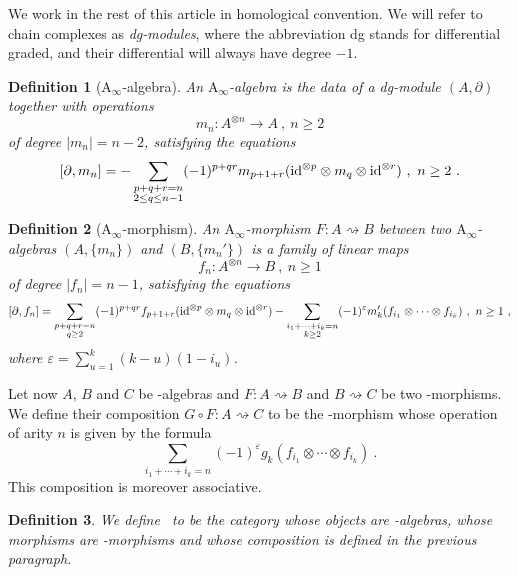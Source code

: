 \documentclass[twoside, 12pt]{amsart}
\newtheorem{definition}{Definition}[section]
\theoremstyle{remark}
\begin{document}
We work in the rest of this article in homological convention. We will refer to chain complexes as \emph{dg-modules}, where the abbreviation dg stands for differential graded, and their differential will always have degree $-1$.

\begin{definition}[$\mathrm{A}_\infty$-algebra] \label{def:ainf-alg} An \emph{$\mathrm{A}_\infty$-algebra} is the data of a dg-module $(A,\partial)$ together with operations \[ m_n : A^{\otimes n} \to A \ , \ n \geq 2 \] of degree $|m_n|=n-2$, satisfying the equations 
\[ [ \partial , m_n ] = - \sum_{\substack{p+q+r=n \\ 2 \leq q \leq n-1}} (-1)^{p+qr}m_{p+1+r}(\mathrm{id}^{\otimes p} \otimes m_q \otimes \mathrm{id}^{\otimes r}) \ , \ n\geq 2 \ . \]
\end{definition}

\begin{definition}[$\mathrm{A}_\infty$-morphism] \label{def:ainf-morph}
An \emph{$\mathrm{A}_\infty$-morphism} $F : A\rightsquigarrow B$ between two $\mathrm{A}_\infty$-algebras $(A,\{m_n\})$ and $(B,\{m_n'\})$ is a family of linear maps \[f_n : A^{\otimes n} \to B \ , \ n \geq 1\] of degree $|f_n|=n-1$, satisfying the equations  \[
 [ \partial , f_n] =  \sum_{\substack{p+q+r=n \\ q \geq 2}} (-1)^{p+qr}f_{p+1+r}(\mathrm{id}^{\otimes p} \otimes m_q \otimes \mathrm{id}^{\otimes r}) -  \sum_{\substack{i_1+\cdots+i_k=n \\ k \geq 2}} (-1)^{\varepsilon} m_k'(f_{i_1}\otimes\cdots\otimes f_{i_k})  \ , \ n \geq 1 \ ,\] where $\varepsilon = \sum_{u=1}^{k}(k-u)(1-i_u)$.
\end{definition}

Let now $A$, $B$ and $C$ be \Ainf -algebras and $F : A \rightsquigarrow B$ and $B \rightsquigarrow C$ be two \Ainf -morphisms. We define their composition $G \circ F : A \rightsquigarrow C$ to be the \Ainf -morphism whose operation of arity $n$ is given by the formula
\[ \sum_{i_1+\cdots+i_k=n} (-1)^{\varepsilon} g_k(f_{i_1}\otimes\cdots\otimes f_{i_k})  \ . \]
This composition is moreover associative.

\begin{definition}
We define \Aalg\ to be the category whose objects are \Ainf -algebras, whose morphisms are \Ainf -morphisms and whose composition is defined in the previous paragraph.
\end{definition}
\end{document}
